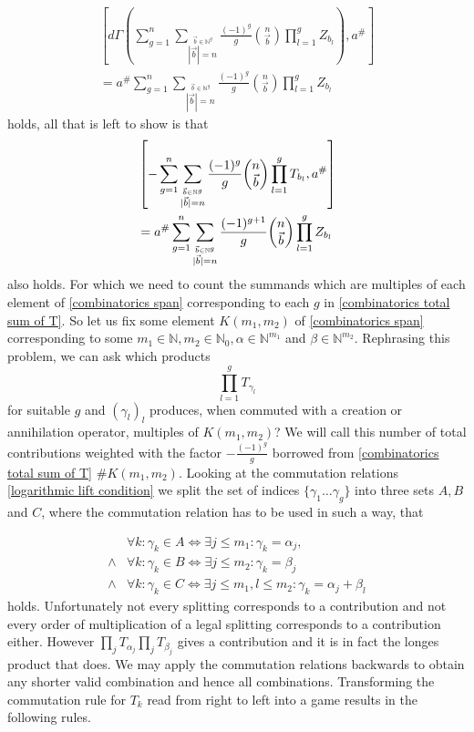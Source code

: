 \documentclass[b5paper,draft,openbib,12pt]{memoir}
\begin{document}
\begin{align*}
\left[ d\Gamma\left(\sum_{g=1}^n \sum_{\stackrel{\vec{b}\in\mathbb{N}^g}{|\vec{b}|=n}}\frac{(-1)^g}{g} 
\binom{n}{\vec{b}}  \prod_{l=1}^g Z_{b_l}\right), a^\#\right]\\
= a^\# \sum_{g=1}^n \sum_{\stackrel{\vec{b}\in\mathbb{N}^g}{|\vec{b}|=n}}\frac{(-1)^g}{g} 
\binom{n}{\vec{b}}  \prod_{l=1}^g Z_{b_l}
\end{align*}
holds, all that is left to show is that 
\begin{align}\label{combinatorics total commutator}
&\left[-\sum_{g=1}^n \sum_{\stackrel{\vec{b}\in\mathbb{N}^g}{|\vec{b}|=n}}\frac{(-1)^g}{g} 
\binom{n}{\vec{b}} \prod_{l=1}^g T_{b_l}, a^\#\right]\\\notag
&= a^\# \sum_{g=1}^n \sum_{\stackrel{\vec{b}\in\mathbb{N}^g}{|\vec{b}|=n}}\frac{(-1)^{g+1}}{g} 
\binom{n}{\vec{b}}  \prod_{l=1}^g Z_{b_l}
\end{align}
also holds. For which we need to count the summands which are multiples of each element of \eqref{combinatorics span}
 corresponding to each \(g\) in \eqref{combinatorics total sum of T}. So let us fix some element
 \(K(m_1,m_2)\) of \eqref{combinatorics span} corresponding to some \(m_1\in\mathbb{N},
 m_2\in\mathbb{N}_0, \alpha \in \mathbb{N}^{m_1}\) and \( \beta\in \mathbb{N}^{m_2}\).
Rephrasing this problem, we can ask which products
\begin{equation}
\prod_{l=1}^g T_{\gamma_l}
\end{equation}
 for suitable \(g\) and \((\gamma_l)_l\) produces, when commuted with a creation or annihilation operator, 
  multiples of \(K(m_1,m_2)\)? We will call this number of 
 total contributions weighted with the factor 
 \( - \frac{(-1)^g}{g}\) borrowed from \eqref{combinatorics total sum of T} \(\#K(m_1,m_2)\).  
 Looking at the commutation relations 
\eqref{logarithmic lift condition} we split the set of indices \(\{\gamma_1\dots \gamma_g\}\) into
three sets \(A,B\) and \(C\), where the commutation relation has to be used in such a way, that

\begin{align*}
&\forall k: \gamma_k \in A \iff \exists j\le m_1: \gamma_k = \alpha_j, \\
\wedge& \forall k: \gamma_k \in B \iff \exists j\le m_2: \gamma_k = \beta_j\\
\wedge & \forall k: \gamma_k \in C \iff \exists j\le m_1, l\le m_2: \gamma_k = \alpha_j + \beta_l
\end{align*}
 holds. Unfortunately not every splitting corresponds to a contribution and not every
 order of multiplication of a legal splitting corresponds to a contribution either.
 However \(\prod_{j} T_{\alpha_j} \prod_j T_{\beta_j}\) gives
 a contribution and it is in fact the longes product that does.
 We may apply the commutation relations backwards to obtain any
 shorter valid combination and hence all combinations. 
 Transforming the commutation rule for \(T_k\) read from right to left
 into a game results in the following rules.
 
\end{document}
